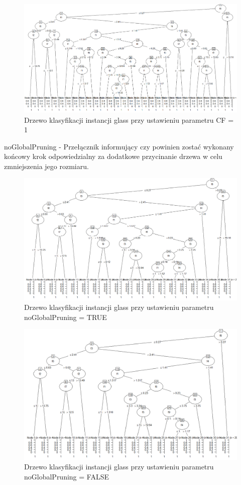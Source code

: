 \documentclass[12pt,a4paper]{article}
\begin{document}
\begin{figure}[H]
\centering
\includegraphics[width=1\textwidth]{glassCF_1.png}
\caption{Drzewo klasyfikacji instancji glass przy ustawieniu parametru CF = 1}
\end{figure}

noGlobalPruning - Przełącznik informujący czy powinien zostać wykonany końcowy krok odpowiedzialny za dodatkowe przycinanie drzewa w celu zmniejszenia jego rozmiaru.

\begin{figure}[H]
\centering
\includegraphics[width=1\textwidth]{no_GP_Glass.png}
\caption{Drzewo klasyfikacji instancji glass przy ustawieniu parametru noGlobalPruning = TRUE}
\end{figure}

\begin{figure}[H]
\centering
\includegraphics[width=1\textwidth]{GP_Glass.png}
\caption{Drzewo klasyfikacji instancji glass przy ustawieniu parametru noGlobalPruning = FALSE}
\end{figure}
\end{document}
